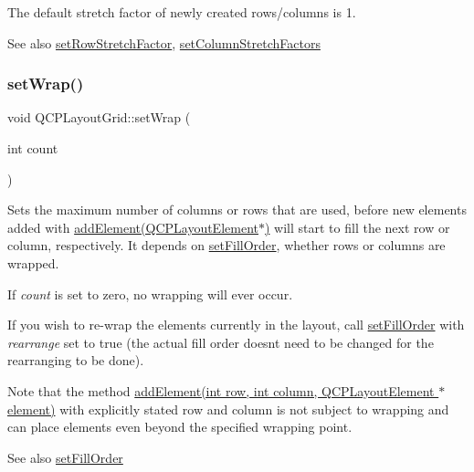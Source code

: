The default stretch factor of newly created rows/columns is 1.

\begin{DoxySeeAlso}{See also}
\hyperlink{class_q_c_p_layout_grid_a7b0273de5369bd93d942edbaf5b166ec}{set\+Row\+Stretch\+Factor}, \hyperlink{class_q_c_p_layout_grid_a6c2591d1a7e2534ce036989543b49e57}{set\+Column\+Stretch\+Factors} 
\end{DoxySeeAlso}
\mbox{\label{class_q_c_p_layout_grid_ab36af18d77e4428386d02970382ee598}} 
\subsubsection{\texorpdfstring{set\+Wrap()}{setWrap()}}
{\footnotesize\ttfamily void Q\+C\+P\+Layout\+Grid\+::set\+Wrap (\begin{DoxyParamCaption}\item[{int}]{count }\end{DoxyParamCaption})}

Sets the maximum number of columns or rows that are used, before new elements added with \hyperlink{class_q_c_p_layout_grid_a4c44025dd25acd27e053cadfd448ad7b}{add\+Element(\+Q\+C\+P\+Layout\+Element$\ast$)} will start to fill the next row or column, respectively. It depends on \hyperlink{class_q_c_p_layout_grid_affc2f3cfd22f28698c5b29b960d2a391}{set\+Fill\+Order}, whether rows or columns are wrapped.

If {\itshape count} is set to zero, no wrapping will ever occur.

If you wish to re-\/wrap the elements currently in the layout, call \hyperlink{class_q_c_p_layout_grid_affc2f3cfd22f28698c5b29b960d2a391}{set\+Fill\+Order} with {\itshape rearrange} set to true (the actual fill order doesn\textquotesingle{}t need to be changed for the rearranging to be done).

Note that the method \hyperlink{class_q_c_p_layout_grid_adff1a2ca691ed83d2d24a4cd1fe17012}{add\+Element(int row, int column, Q\+C\+P\+Layout\+Element $\ast$element)} with explicitly stated row and column is not subject to wrapping and can place elements even beyond the specified wrapping point.

\begin{DoxySeeAlso}{See also}
\hyperlink{class_q_c_p_layout_grid_affc2f3cfd22f28698c5b29b960d2a391}{set\+Fill\+Order} 
\end{DoxySeeAlso}
\mbox{\label{class_q_c_p_layout_grid_a38621ca7aa633b6a9a88617df7f08672}} 
